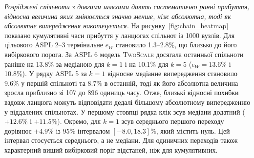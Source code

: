 \documentclass[a4paper,fleqn]{cas-sc}
\newcommand{\TS}{\textup{\textsc{TwoScale}}}
\newcommand{\eW}{e_{W}}
\begin{document}
\emph{Розріджені спільноти з довгими шляхами дають систематично ранні прибуття, відносна величина яких змінюється значно менше, ніж абсолютна, тоді як абсолютне випередження накопичується.} На рисунку~\ref{fig:chain_heatmap} показано кумулятивні часи прибуття у ланцюгах спільнот із 1000 вузлів. Для цільового ASPL 2--3 термінальне $\eW$ становило 1.3--2.8\%, що близько до його вибіркового порога. За ASPL 6 модель \TS{} досягала останньої спільноти раніше на 13.8\% за медіаною для $k=1$ і на 10.1\% для $k=5$ ($\eW=13.6\%$ і 10.8\%). У рядку ASPL 5 за $k=1$ відносне медіанне випередження становило 9.6\% у першій спільноті та 8.7\% в останній, тоді як його абсолютна величина зросла приблизно зі 107 до 896 одиниць часу. Отже, близькі відносні похибки вздовж ланцюга можуть відповідати дедалі більшому абсолютному випередженню у віддалених спільнотах. У першому стовпці рядка клік зсув медіани додатний ($+12.6\%$ і $+11.5\%$). Окремо, для $k=1$ зсув середнього першого переходу дорівнює $+4.9\%$ із 95\% інтервалом $[-8.0,18.3]\%$, який містить нуль. Цей інтервал стосується середнього, а не медіани. Для одиничних переходів також характерний вищий вибірковий поріг відстаней, ніж для кумулятивних.
\end{document}
